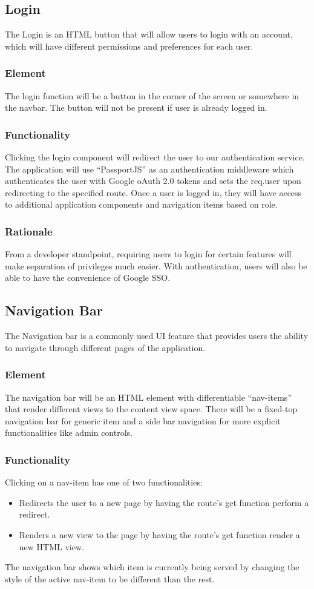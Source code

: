 \documentclass[journal,10pt,onecolumn,compsoc]{IEEEtran}
\begin{document}
	\subsection{Login}
	The Login is an HTML button that will allow users to login with an account, which will have different permissions and preferences for each user.
	\subsubsection{Element}
	The login function will be a button in the corner of the screen or somewhere in the navbar. The button will not be present if user is already logged in.
	\subsubsection{Functionality}
    Clicking the login component will redirect the user to our authentication service. The application will use ``PassportJS'' as an authentication middleware which authenticates the user with Google oAuth 2.0 tokens and sets the req.user upon redirecting to the specified route. Once a user is logged in, they will have access to additional application components and navigation items based on role.
	\subsubsection{Rationale}
	From a developer standpoint, requiring users to login for certain features will make separation of privileges much easier. With authentication, users will also be able to have the convenience of Google SSO.
	
	\subsection{Navigation Bar}
	The Navigation bar is a commonly used UI feature that provides users the ability to navigate through different pages of the application.
    \subsubsection{Element}
    The navigation bar will be an HTML element with differentiable ``nav-items'' that render different views to the content view space. There will be a fixed-top navigation bar for generic item and a side bar navigation for more explicit functionalities like admin controls. 
    \subsubsection{Functionality}
    Clicking on a nav-item has one of two functionalities: 
    \begin{itemize}
        \item Redirects the user to a new page by having the route's get function perform a redirect.
        \item Renders a new view to the page by having the route's get function render a new HTML view.
    \end{itemize}
	The navigation bar shows which item is currently being served by changing the style of the active nav-item to be different than the rest.
\end{document}
